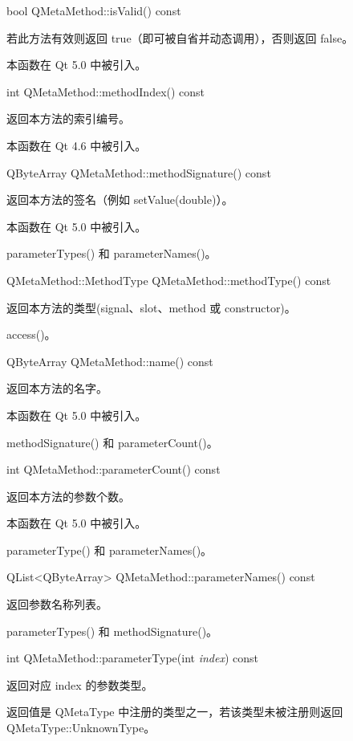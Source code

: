 bool QMetaMethod::isValid() const

若此方法有效则返回 true（即可被自省并动态调用），否则返回 false。

本函数在 Qt 5.0 中被引入。

int QMetaMethod::methodIndex() const

返回本方法的索引编号。

本函数在 Qt 4.6 中被引入。

QByteArray QMetaMethod::methodSignature() const

返回本方法的签名（例如 setValue(double)）。

本函数在 Qt 5.0 中被引入。

\begin{notice}[另请参阅]
parameterTypes() 和 parameterNames()。
\end{notice}

QMetaMethod::MethodType QMetaMethod::methodType() const

返回本方法的类型(signal、slot、method 或 constructor)。

\begin{notice}[另请参阅]
access()。
\end{notice}

QByteArray QMetaMethod::name() const

返回本方法的名字。

本函数在 Qt 5.0 中被引入。

\begin{notice}[另请参阅]
methodSignature() 和 parameterCount()。
\end{notice}

int QMetaMethod::parameterCount() const

返回本方法的参数个数。

本函数在 Qt 5.0 中被引入。

\begin{notice}[另请参阅]
parameterType() 和 parameterNames()。
\end{notice}

QList<QByteArray> QMetaMethod::parameterNames() const

返回参数名称列表。

\begin{notice}[另请参阅]
parameterTypes() 和 methodSignature()。
\end{notice}

int QMetaMethod::parameterType(int \emph{index}) const

返回对应 index 的参数类型。

返回值是 QMetaType 中注册的类型之一，若该类型未被注册则返回 QMetaType::UnknownType。

